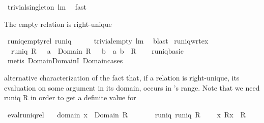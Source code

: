 \begin{isabellebody}
\ trivial{\isacharunderscore}singleton\ lm{}{}\ \isamarkupfalse%
\ fast%
\endisatagproof
{\isafoldproof}%
%
\isadelimproof
%
\endisadelimproof
%
\begin{isamarkuptext}%
The empty relation is right-unique%
\end{isamarkuptext}%
\isamarkuptrue%
\isamarkupfalse%
\ runiq{\isacharunderscore}emptyrel{\isacharcolon}\ {\isachardoublequoteopen}runiq\ {\isacharbraceleft}{\isacharbraceright}{\isachardoublequoteclose}\ \isanewline
%
\isadelimproof
\ \ %
\endisadelimproof
%
\isatagproof
{}\isamarkupfalse%
\ trivial{\isacharunderscore}empty\ lm{}{}\ \isamarkupfalse%
\ blast%
\endisatagproof
{\isafoldproof}%
%
\isadelimproof
\isanewline
%
\endisadelimproof
\isanewline
\isanewline
{}\isamarkupfalse%
\ runiq{\isacharunderscore}wrt{\isacharunderscore}ex{}{\isacharcolon}\isanewline
\ \ {\isachardoublequoteopen}runiq\ R\ {\isasymlongleftrightarrow}\ {\isacharparenleft}{\isasymforall}\ a\ {\isasymin}\ Domain\ R\ {\isachardot}\ {\isasymexists}{\isacharbang}\ b\ {\isachardot}\ {\isacharparenleft}a{\isacharcomma}\ b{\isacharparenright}\ {\isasymin}\ R{\isacharparenright}{\isachardoublequoteclose}\isanewline
%
\isadelimproof
\ \ %
\endisadelimproof
%
\isatagproof
{}\isamarkupfalse%
\ runiq{\isacharunderscore}basic\ \isamarkupfalse%
\ {\isacharparenleft}metis\ Domain{\isachardot}DomainI\ Domain{\isachardot}cases{\isacharparenright}%
\endisatagproof
{\isafoldproof}%
%
\isadelimproof
%
\endisadelimproof
%
\begin{isamarkuptext}%
alternative characterization of the fact that, if a relation  is right-unique,
  its evaluation  on some argument  in its domain, occurs in 's
  range. Note that we need runiq R in order to get a definite value for %
\end{isamarkuptext}%
\isamarkuptrue%
\isamarkupfalse%
\ eval{\isacharunderscore}runiq{\isacharunderscore}rel{\isacharcolon}\isanewline
\ \ \ domain{\isacharcolon}\ {\isachardoublequoteopen}x\ {\isasymin}\ Domain\ R{\isachardoublequoteclose}\isanewline
\ \ \ \ \ \ \ runiq{\isacharcolon}\ {\isachardoublequoteopen}runiq\ R{\isachardoublequoteclose}\ \isanewline
\ \ \ {\isachardoublequoteopen}{\isacharparenleft}x{\isacharcomma}\ R{\isacharcomma}{\isacharcomma}x{\isacharparenright}\ {\isasymin}\ R{\isachardoublequoteclose}\isanewline

\end{isabellebody}
